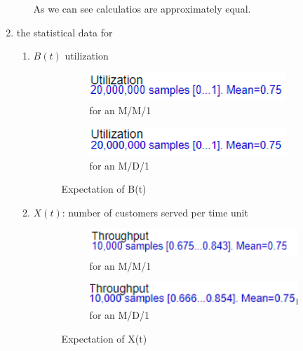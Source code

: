 \documentclass{homework}
\begin{document}
\begin{enumerate}[label=(\alph*)]
\begin{enumerate}[label=(\roman*)]
	As we can see calculatios are approximately equal.
	\end{enumerate}
	\item the statistical data for
	\begin{enumerate}[label=(\roman*)]
		\item $B(t)$ utilization
		\begin{figure}[hbt!]
		     \centering
		     \begin{subfigure}[hbt!]{0.4\textwidth}
			\centering
			\includegraphics[width=\textwidth]{U_MM1.png}
			\caption{for an M/M/1}
		     \end{subfigure}
		     \hfill
		     \begin{subfigure}[hbt!]{0.4\textwidth}
		         \centering
		         \includegraphics[width=\textwidth]{U_MD1.png}
		         \caption{for an M/D/1}
		     \end{subfigure}
		        \caption{Expectation of B(t)}
		\end{figure}
		\item $X(t)$: number of customers served per time unit
		\begin{figure}[hbt!]
		     \centering
		     \begin{subfigure}[hbt!]{0.4\textwidth}
			\centering
			\includegraphics[width=\textwidth]{X_MM1.png}
			\caption{for an M/M/1}
		     \end{subfigure}
		     \hfill
		     \begin{subfigure}[hbt!]{0.4\textwidth}
		         \centering
		         \includegraphics[width=\textwidth]{X_MD1.png}
		         \caption{for an M/D/1}
		     \end{subfigure}
		        \caption{Expectation of X(t)}
		\end{figure}


\end{enumerate}
\end{enumerate}
\end{document}
